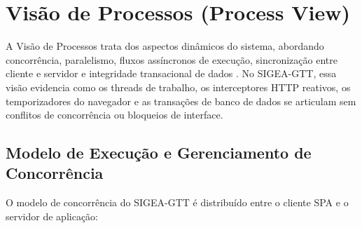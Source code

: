 \chapter{Visão de Processos (Process View)}
\label{cap_visao_processos}

A Visão de Processos trata dos aspectos dinâmicos do sistema, abordando concorrência, paralelismo, fluxos assíncronos de execução, sincronização entre cliente e servidor e integridade transacional de dados \cite{kruchten1995}. No SIGEA-GTT, essa visão evidencia como os threads de trabalho, os interceptores HTTP reativos, os temporizadores do navegador e as transações de banco de dados se articulam sem conflitos de concorrência ou bloqueios de interface.

\section{Modelo de Execução e Gerenciamento de Concorrência}
\label{sec_modelo_execucao}

O modelo de concorrência do SIGEA-GTT é distribuído entre o cliente SPA e o servidor de aplicação:

